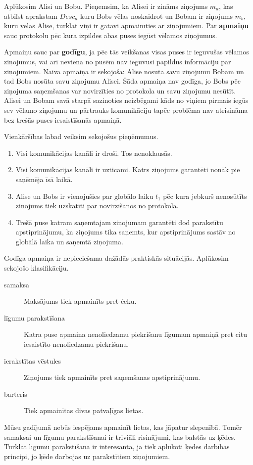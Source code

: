 Aplūkosim Alisi un Bobu. Pieņemsim, ka Alisei ir zināms ziņojums $m_a$, kas atbilst aprakstam $Desc_a$ kuru Bobs vēlas noskaidrot un Bobam ir ziņojums $m_b$, kuru vēlas Alise, turklāt viņi ir gatavi apmainīties ar ziņojumiem. Par \textbf{apmaiņu} sauc protokolu pēc kura izpildes abas puses iegūst vēlamos ziņojumus. 

Apmaiņu sauc par \textbf{godīgu}, ja pēc tās veikšanas visas puses ir ieguvušas vēlamos ziņojumus, vai arī neviena no pusēm nav ieguvusi papildus informāciju par ziņojumiem. Naiva apmaiņa ir sekojoša: Alise nosūta savu ziņojumu Bobam un tad Bobs nosūta savu ziņojumu Alisei. Šāda apmaiņa nav godīga, jo Bobs pēc ziņojuma saņemšanas var novirzīties no protokola un savu ziņojumu nesūtīt. Alisei un Bobam savā starpā sazinoties neizbēgami kāds no viņiem pirmais iegūs sev vēlamo ziņojumu un pārtrauks komunikāciju tapēc problēma nav atrisināma bez trešās puses iesaistīšanās apmaiņā.\cite{pagnia99}

Vienkāršības labad veiksim sekojošus pieņēmumus.
\begin{enumerate}
    \item Visi komunikācijas kanāli ir droši. Tos nenoklausās.
    \item Visi komunikācijas kanāli ir uzticami. Katrs ziņojums garantēti nonāk pie saņēmēja īsā laikā.
    \item Alise un Bobs ir vienojušies par globālo laiku $t_1$ pēc kura jebkurš nenosūtīts ziņojums tiek uzskatīti par novirzīšanos no protokola.
    \item Trešā puse katram saņemtajam ziņojumam garantēti dod parakstītu apstiprinājumu, ka ziņojums tika saņemts, kur apstiprinājums sastāv no globālā laika un saņemtā ziņojuma.
\end{enumerate}

Godīga apmaiņa ir nepieciešama dažādās praktiskās situācijās. Aplūkosim sekojošo klasifikāciju.\cite[p.~8]{asokan98}
\begin{description}
    \item[samaksa] Maksājums tiek apmainīts pret čeku.
    \item[līgumu parakstīšana] Katra puse apmaina nenoliedzamu piekrišanu līgumam apmaiņā pret citu iesaistīto nenoliedzamu piekrišanu.
    \item[ierakstītas vēstules] Ziņojums tiek apmainīts pret saņemšanas apstiprinājumu.
    \item[barteris] Tiek apmainītas divas patvaļīgas lietas.
\end{description}
Mūsu gadījumā nebūs iespējams apmainīt lietas, kas jāpatur slepenībā. Tomēr samaksai un līgumu parakstīšanai ir triviāli risinājumi, kas balstās uz ķēdes. Turklāt līgumu parakstīšana ir interesanta, ja tiek aplūkoti ķēdes darbības principi, jo ķēde darbojas uz parakstītiem ziņojumiem.

